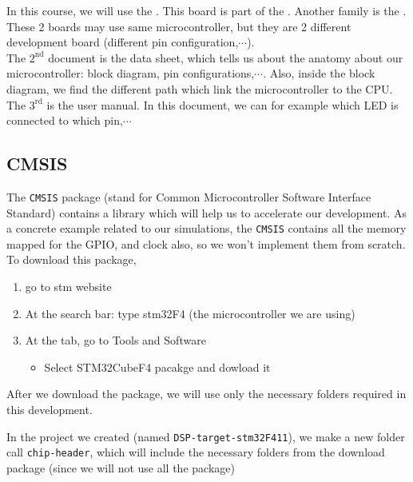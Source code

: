 \documentclass[12pt,a4paper]{book}
\begin{document}
In this course, we will use the . This board is part of the . Another family is the . These 2 boards may use same microcontroller, but they are 2 different development board (different pin configuration,$\cdots$).\\

The $\mathrm{2}^\mathrm{nd}$ document is the data sheet, which tells us about the anatomy about our microcontroller: block diagram, pin configurations,$\cdots$. Also, inside the block diagram, we find the different path which link the microcontroller to the CPU.\\

The $\mathrm{3}^\mathrm{rd}$ is the user manual. In this document, we can for example which LED is connected to which pin,$\cdots$

\newpage
\subsection{CMSIS}

The \verb|CMSIS| package (stand for Common Microcontroller Software Interface Standard) contains a library which will help us to accelerate our development. As a concrete example related to our simulations, the \verb|CMSIS| contains all the memory mapped for the GPIO, and clock also, so we won't implement them from scratch.\\

To download this package, 

\begin{enumerate}

\item go to stm website

\item At the search bar: type stm32F4 (the microcontroller we are using)

\item  At the tab, go to Tools and Software

\begin{itemize}
    \item Select STM32CubeF4 pacakge and dowload it

\end{itemize}

\end{enumerate}

After we download the package, we will use only the necessary folders required in this development. 

In the project we created (named \verb|DSP-target-stm32F411|), we make a new folder call \verb|chip-header|, which will include the necessary folders from the download package (since we will not use all the package)
\end{document}
